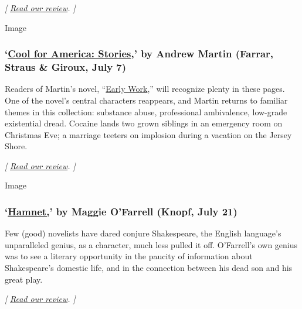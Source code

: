 \emph{{[}}
\href{https://www.nytimes.com/2020/07/04/books/review-burning-down-house-newt-gingrich-julian-zelizer.html}{\emph{Read
our review}}\emph{. {]}}

Image

\hypertarget{cool-for-america-stories-by-andrew-martin-farrar-straus--giroux-july-7}{%
\subsubsection{\texorpdfstring{`\href{https://us.macmillan.com/books/9780374108168}{Cool
for America: Stories},' by Andrew Martin (Farrar, Straus \& Giroux, July
7)}{`Cool for America: Stories,' by Andrew Martin (Farrar, Straus \& Giroux, July 7)}}\label{cool-for-america-stories-by-andrew-martin-farrar-straus--giroux-july-7}}

Readers of Martin's novel,
``\href{https://www.nytimes.com/2018/07/25/books/review/andrew-martin-early-work.html}{Early
Work},'' will recognize plenty in these pages. One of the novel's
central characters reappears, and Martin returns to familiar themes in
this collection: substance abuse, professional ambivalence, low-grade
existential dread. Cocaine lands two grown siblings in an emergency room
on Christmas Eve; a marriage teeters on implosion during a vacation on
the Jersey Shore.

\emph{{[}}
\href{https://www.nytimes.com/2020/07/07/books/review/cool-for-america-andrew-martin.html}{\emph{Read
our review}}\emph{. {]}}

Image

\hypertarget{hamnet-by-maggie-ofarrell-knopf-july-21}{%
\subsubsection{\texorpdfstring{`\href{https://www.penguinrandomhouse.com/books/612385/hamnet-by-maggie-ofarrell/}{Hamnet,}'
by Maggie O'Farrell (Knopf, July
21)}{`Hamnet,' by Maggie O'Farrell (Knopf, July 21)}}\label{hamnet-by-maggie-ofarrell-knopf-july-21}}

Few (good) novelists have dared conjure Shakespeare, the English
language's unparalleled genius, as a character, much less pulled it off.
O'Farrell's own genius was to see a literary opportunity in the paucity
of information about Shakespeare's domestic life, and in the connection
between his dead son and his great play.

\emph{{[}}
\href{https://www.nytimes.com/2020/07/17/books/review/hamnet-maggie-ofarrell.html}{\emph{Read
our review}}\emph{. {]}}

